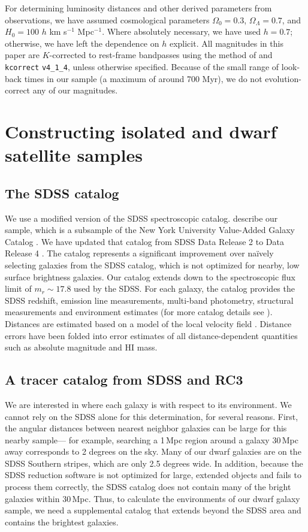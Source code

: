 \documentclass[10pt,preprint]{aastex}
\begin{document}
For determining luminosity distances and other derived parameters from
observations, we have assumed cosmological parameters $\Omega_0 =
0.3$, $\Omega_\Lambda = 0.7$, and $H_0 = 100$ $h$ km s$^{-1}$
Mpc$^{-1}$. Where absolutely necessary, we have used $h=0.7$;
otherwise, we have left the dependence on $h$ explicit. All magnitudes
in this paper are $K$-corrected to rest-frame bandpasses using the
method of \citet{blanton03b} and {\tt kcorrect} {\tt v4\_1\_4}, unless
otherwise specified.  Because of the small range of look-back times in
our sample (a maximum of around 700 Myr), we do not evolution-correct
any of our magnitudes.

\section{ Constructing isolated and dwarf satellite samples}
\label{data}

\subsection{The SDSS catalog}

We use a modified version of the SDSS spectroscopic catalog.
\citet{blanton04b} describe our sample, which is a subsample of the
New York University Value-Added Galaxy Catalog
\citep[NYU-VAGC;][]{blanton05a}. We have updated that catalog from
SDSS Data Release 2 to Data Release 4 \citep[DR4;][]{adelman06a}.  The
\citet{blanton04b} catalog represents a significant improvement over
na\"ively selecting galaxies from the SDSS catalog, which is not
optimized for nearby, low surface brightness galaxies.  Our catalog
extends down to the spectroscopic flux limit of $m_r \sim 17.8$ used
by the SDSS.  For each galaxy, the catalog provides the SDSS redshift,
emission line measurements, multi-band photometry, structural
measurements and environment estimates (for more catalog details see
\citealt{blanton04b}).  Distances are estimated based on a model of
the local velocity field \citep{willick97a}.  Distance errors have
been folded into error estimates of all distance-dependent quantities
such as absolute magnitude and HI mass.

\subsection{ A tracer catalog from SDSS and RC3}

We are interested in where each galaxy is with respect to its
environment.  We cannot rely on the SDSS alone for this determination,
for several reasons.  First, the angular distances between nearest
neighbor galaxies can be large for this nearby sample--- for example,
searching a 1\,Mpc region around a galaxy 30\,Mpc away corresponds to
2 degrees on the sky.  Many of our dwarf galaxies are on the SDSS
Southern stripes, which are only 2.5 degrees wide.  In addition,
because the SDSS reduction software is not optimized for large,
extended objects and fails to process them correctly, the SDSS catalog
does not contain many of the bright galaxies within 30\,Mpc.  Thus, to
calculate the environments of our dwarf galaxy sample, we need a
supplemental catalog that extends beyond the SDSS area and contains
the brightest galaxies.
\end{document}
